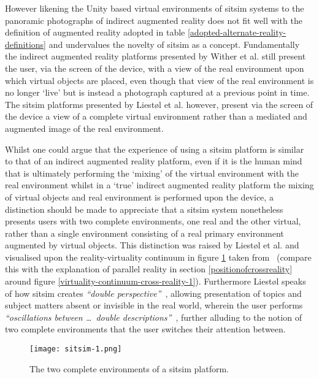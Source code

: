 However likening the Unity based virtual environments of sitsim systems to the panoramic photographs of indirect augmented reality does not fit well with the definition of augmented reality adopted in table \ref{adopted-alternate-reality-definitions} and undervalues the novelty of sitsim as a concept. Fundamentally the indirect augmented reality platforms presented by Wither et al. still present the user, via the screen of the device, with a view of the real environment upon which virtual objects are placed, even though that view of the real environment is no longer `live' but is instead a photograph captured at a previous point in time. The sitsim platforms presented by Liest\o l et al. however, present via the screen of the device a view of a complete virtual environment rather than a mediated and augmented image of the real environment.

Whilst one could argue that the experience of using a sitsim platform is similar to that of an indirect augmented reality platform, even if it is the human mind that is ultimately performing the `mixing' of the virtual environment with the real environment whilst in a `true' indirect augmented reality platform the mixing of virtual objects and real environment is performed upon the device, a distinction should be made to appreciate that a sitsim system nonetheless presents users with two complete environments, one real and the other virtual, rather than a single environment consisting of a real primary environment augmented by virtual objects. This distinction was raised by Liest\o l et al. and visualised upon the reality-virtuality continuum in figure \ref{sitsim-1.png} taken from~\cite{Liestøl2011} (compare this with the explanation of parallel reality in section \ref{positionofcrossreality} around figure \ref{virtuality-continuum-cross-reality-1}). Furthermore Liest\o l speaks of how sitsim creates \textit{``double perspective''}~\cite{Liestøl2009}, allowing presentation of topics and subject matters absent or invisible in the real world, wherein the user performs \textit{``oscillations between \ldots\ double descriptions''}~\cite{Liestøl2014}, further alluding to the notion of two complete environments that the user switches their attention between.

\begin{figure}[h]
\centering
  \texttt{[image: sitsim-1.png]}
  \caption{The two complete environments of a sitsim platform.}
  \label{sitsim-1.png}
\end{figure}

